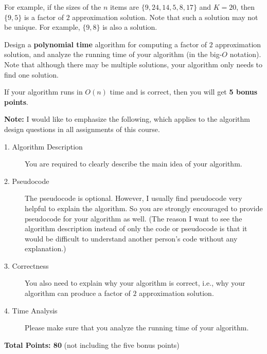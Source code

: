 \documentclass[11pt]{article}
\begin{document}
\begin{enumerate}
For example, if the sizes of the $n$ items are $\{9, 24, 14, 5, 8, 17\}$ and $K=20$, then $\{9, 5\}$ is a factor of $2$ approximation solution. Note that such a solution may not be unique. For example, $\{9, 8\}$ is also a solution. 

Design a {\bf polynomial time} algorithm for computing a factor of $2$ approximation solution, and analyze the running time of your algorithm (in the big-$O$ notation). Note that although there may be multiple solutions, your algorithm only needs to find one solution. 

If your
algorithm runs in $O(n)$ time and is correct, then you will get {\bf 5 bonus points}.

\vspace{0.2in}

{\bf Note:} I would like to emphasize the following, which applies to the algorithm design questions in all assignments of this course.

\begin{description}
\item[1. Algorithm Description]
You are required to clearly describe the main idea of your algorithm.

\item[2. Pseudocode]
The pseudocode is optional. However, I usually find pseudocode very helpful to explain the algorithm. So you are strongly encouraged to provide pseudocode for your algorithm as well. (The reason I want to see the algorithm description instead of only the code or pseudocode is that it would be difficult to understand another person's code without any explanation.)

\item[3. Correctness]
You also need to explain why your algorithm is correct, i.e., why your algorithm can produce a factor of $2$ approximation solution.

\item[4. Time Analysis]
Please make sure that you analyze the running time of your algorithm.
\end{description}
\end{enumerate}


\vspace{0.3in}
{\bf Total Points: 80} (not including the five bonus points)
\end{document}
